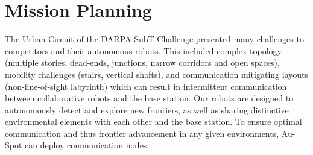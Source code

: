 \documentclass[letterpaper, 10pt, conference]{ieeeconf}      %
\newcommand{\ph}[1]{{\textbf{#1}:}} %
\newcommand{\todo}[1]{{\color{red} #1 }} %
\newcommand{\inst}[1]{{\color{orange} #1 }} %
\begin{document}







\section{Mission Planning}\label{sec:mission_planning}


The Urban Circuit of the DARPA SubT Challenge presented many challenges to competitors and their autonomous robots. This included complex topology (multiple stories, dead-ends, junctions, narrow corridors and open spaces), mobility challenges (stairs, vertical shafts), and communication mitigating layouts (non-line-of-sight labyrinth) which can result in intermittent communication between collaborative robots and the base station. Our robots are designed to autonomously detect and explore new frontiers, as well as sharing distinctive environmental elements with each other and the base station. To ensure optimal communication and thus frontier advancement in any given environments, Au-Spot can deploy communication nodes.
\end{document}
